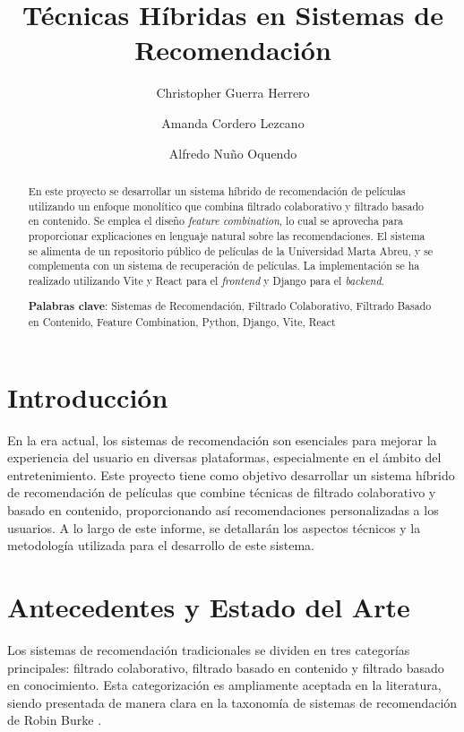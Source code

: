 \documentclass{llncs}
\begin{document}
	
	\title{Técnicas Híbridas en Sistemas de Recomendación}
	\author{Christopher Guerra Herrero \and Amanda Cordero Lezcano \and Alfredo Nuño Oquendo}
	
	\maketitle
	
	\begin{abstract}
		En este proyecto se desarrollar un sistema híbrido de recomendación de películas utilizando un enfoque monolítico que combina filtrado colaborativo y filtrado basado en contenido. Se emplea el diseño \textit{feature combination}, lo cual se aprovecha para proporcionar explicaciones en lenguaje natural sobre las recomendaciones. El sistema se alimenta de un repositorio público de películas de la Universidad Marta Abreu, y se complementa con un sistema de recuperación de películas. La implementación se ha realizado utilizando Vite y React para el 	\textit{frontend} y Django para el 	\textit{backend}. 
		
		\textbf{Palabras clave}: Sistemas de Recomendación, Filtrado Colaborativo, Filtrado Basado en Contenido, Feature Combination, Python, Django, Vite, React
	\end{abstract}
	
	\section{Introducción}
	En la era actual, los sistemas de recomendación son esenciales para mejorar la experiencia del usuario en diversas plataformas, especialmente en el ámbito del entretenimiento. Este proyecto tiene como objetivo desarrollar un sistema híbrido de recomendación de películas que combine técnicas de filtrado colaborativo y basado en contenido, proporcionando así recomendaciones personalizadas a los usuarios. A lo largo de este informe, se detallarán los aspectos técnicos y la metodología utilizada para el desarrollo de este sistema.
	
	\section{Antecedentes y Estado del Arte}
	Los sistemas de recomendación tradicionales se dividen en tres categorías principales: filtrado colaborativo, filtrado basado en contenido y filtrado basado en conocimiento. Esta categorización es ampliamente aceptada en la literatura, siendo presentada de manera clara en la taxonomía de sistemas de recomendación de Robin Burke \cite{burke2002hybrid}. 
	
\end{document}
